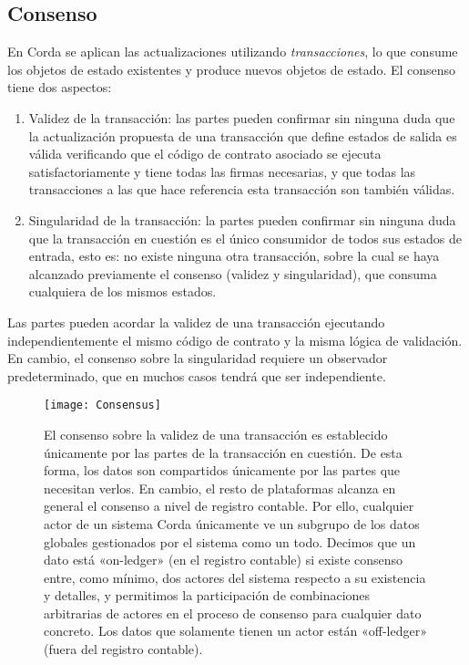 \documentclass{article}
\begin{document}
\subsection{Consenso}
En Corda se aplican las actualizaciones utilizando \textit{transacciones}, lo que consume los objetos de estado existentes y produce nuevos objetos de estado. El consenso tiene dos aspectos:
\begin{enumerate}
\item{Validez de la transacción: las partes pueden confirmar sin ninguna duda que la actualización propuesta de una transacción que define estados de salida es válida verificando que el código de contrato asociado se ejecuta satisfactoriamente y tiene todas las firmas necesarias, y que todas las transacciones a las que hace referencia esta transacción son también válidas.}
\item{Singularidad de la transacción: la partes pueden confirmar sin ninguna duda que la transacción en cuestión es el único consumidor de todos sus estados de entrada, esto es: no existe ninguna otra transacción, sobre la cual se haya alcanzado previamente el consenso (validez y singularidad), que consuma cualquiera de los mismos estados.}
\end{enumerate}

Las partes pueden acordar la validez de una transacción ejecutando independientemente el mismo código de contrato y la misma lógica de validación. En cambio, el consenso sobre la singularidad requiere un observador predeterminado, que en muchos casos tendrá que ser independiente.

\begin{figure}[H]
    \texttt{[image: Consensus]}
    \caption{El consenso sobre la validez de una transacción es establecido únicamente por las partes de la transacción en cuestión. De esta forma, los datos son compartidos únicamente por las partes que necesitan verlos. En cambio, el resto de plataformas alcanza en general el consenso a nivel de registro contable. Por ello, cualquier actor de un sistema Corda únicamente ve un subgrupo de los datos globales gestionados por el sistema como un todo. Decimos que un dato está «on-ledger» (en el registro contable) si existe consenso entre, como mínimo, dos actores del sistema respecto a su existencia y detalles, y permitimos la participación de combinaciones arbitrarias de actores en el proceso de consenso para cualquier dato concreto. Los datos que solamente tienen un actor están «off-ledger» (fuera del registro contable).}
\end{figure}
\end{document}
